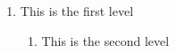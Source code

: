 \documentclass{article}
\begin{document}
	\begin{enumerate}
		\item This is the first level
		\begin{enumerate}
			\item This is the second level
		\end{enumerate}
	\end{enumerate}
\end{document}
